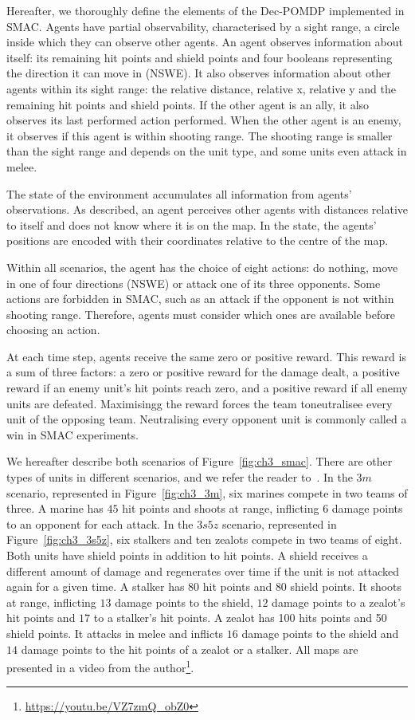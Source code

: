 Hereafter, we thoroughly define the elements of the Dec-POMDP implemented in SMAC.
Agents have partial observability, characterised by a sight range, a circle inside which they can observe other agents.
An agent observes information about itself: its remaining hit points and shield points and four booleans representing the direction it can move in (NSWE). 
It also observes information about other agents within its sight range: the relative distance, relative x, relative y and the remaining hit points and shield points. 
If the other agent is an ally, it also observes its last performed action performed.
When the other agent is an enemy, it observes if this agent is within shooting range.
The shooting range is smaller than the sight range and depends on the unit type, and some units even attack in melee.

The state of the environment accumulates all information from agents' observations.
As described, an agent perceives other agents with distances relative to itself and does not know where it is on the map.
In the state, the agents' positions are encoded with their coordinates relative to the centre of the map.

Within all scenarios, the agent has the choice of eight actions: do nothing, move in one of four directions (NSWE) or attack one of its three opponents.
Some actions are forbidden in SMAC, such as an attack if the opponent is not within shooting range.
Therefore, agents must consider which ones are available before choosing an action.

At each time step, agents receive the same zero or positive reward. 
This reward is a sum of three factors: a zero or positive reward for the damage dealt, a positive reward if an enemy unit's hit points reach zero, and a positive reward if all enemy units are defeated. Maximisingg the reward forces the team toneutralisee every unit of the opposing team. Neutralising every opponent unit is commonly called a win in SMAC experiments.

We hereafter describe both scenarios of Figure~\ref{fig:ch3_smac}.
There are other types of units in different scenarios, and we refer the reader to~\citep{samvelyan2019starcraft}.
In the $3m$ scenario, represented in Figure~\ref{fig:ch3_3m}, six marines compete in two teams of three.
A marine has $45$ hit points and shoots at range, inflicting $6$ damage points to an opponent for each attack.
In the $3s5z$ scenario, represented in Figure~\ref{fig:ch3_3s5z}, six stalkers and ten zealots compete in two teams of eight.
Both units have shield points in addition to hit points.
A shield receives a different amount of damage and regenerates over time if the unit is not attacked again for a given time.
A stalker has $80$ hit points and $80$ shield points.
It shoots at range, inflicting $13$ damage points to the shield, $12$ damage points to a zealot's hit points and $17$ to a stalker's hit points.
A zealot has 100 hits points and 50 shield points.
It attacks in melee and inflicts $16$ damage points to the shield and $14$ damage points to the hit points of a zealot or a stalker.
All maps are presented in a video from the author\footnote{\url{https://youtu.be/VZ7zmQ_obZ0}}.

